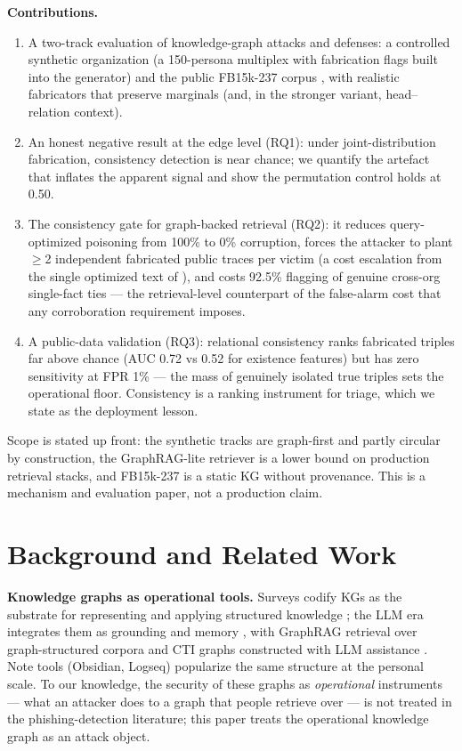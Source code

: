\documentclass[conference]{IEEEtran}
\begin{document}
\noindent\textbf{Contributions.}
\begin{enumerate}
\item A two-track evaluation of knowledge-graph attacks and defenses: a
controlled synthetic organization (a 150-persona multiplex with
fabrication flags built into the generator) and the public FB15k-237
corpus \cite{toutanova2015fb15k}, with realistic fabricators that preserve
marginals (and, in the stronger variant, head--relation context).
\item An honest negative result at the edge level (RQ1): under joint-distribution
fabrication, consistency detection is near chance; we quantify the artefact
that inflates the apparent signal and show the permutation control holds at
0.50.
\item The consistency gate for graph-backed retrieval (RQ2): it reduces
query-optimized poisoning from 100\% to 0\% corruption, forces the attacker
to plant $\ge$2 independent fabricated public traces per victim (a cost
escalation from the single optimized text of \cite{zou2024poisonedrag}), and
costs 92.5\% flagging of genuine cross-org single-fact ties --- the
retrieval-level counterpart of the false-alarm cost that any corroboration
requirement imposes.
\item A public-data validation (RQ3): relational consistency ranks fabricated
triples far above chance (AUC 0.72 vs 0.52 for existence features) but has
zero sensitivity at FPR 1\% --- the mass of genuinely isolated true triples
sets the operational floor. Consistency is a ranking instrument for triage,
which we state as the deployment lesson.
\end{enumerate}
Scope is stated up front: the synthetic tracks are graph-first and
partly circular by construction, the GraphRAG-lite retriever is a lower bound on production
retrieval stacks, and FB15k-237 is a static KG without provenance. This is a
mechanism and evaluation paper, not a production claim.

\section{Background and Related Work}
\label{sec:related}

\textbf{Knowledge graphs as operational tools.} Surveys codify KGs as the
substrate for representing and applying structured knowledge
\cite{hogan2021knowledge,ji2022survey}; the LLM era integrates them as
grounding and memory \cite{pan2024roadmap}, with GraphRAG retrieval over
graph-structured corpora \cite{edge2024graphrag,han2025graphrag} and CTI
graphs constructed with LLM assistance \cite{fieblinger2024actionable,
cheng2024ctinexus}. Note tools (Obsidian, Logseq) popularize the same
structure at the personal scale. To our knowledge, the security of these
graphs as \emph{operational} instruments --- what an attacker does to a graph
that people retrieve over --- is not treated in the phishing-detection
literature; this paper treats the operational knowledge graph as an
attack object.
\end{document}
